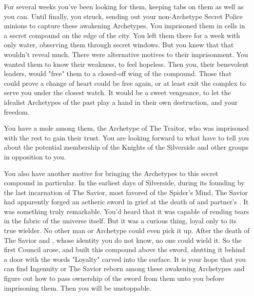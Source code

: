 \documentclass[blue]{Silversiders}
\begin{document}
For several weeks you've been looking for them, keeping tabs on them as well as you can. Until finally, you struck, sending out your non-Archetype Secret Police minions to capture these awakening Archetypes. You imprisoned them in cells in a secret compound on the edge of the city. You left them there for a week with only water, observing them through secret windows. But you knew that that wouldn't reveal much. There were alternative motives to their imprisonment. You wanted them to know their weakness, to feel hopeless. Then you, their benevolent leaders, would "free" them to a closed-off wing of the compound. Those that could prove a change of heart could be free again, or at least exit the complex to serve you under the closest watch. It would be a sweet vengeance, to let the idealist Archetypes of the past play a hand in their own destruction, and your freedom.

You have a mole among them, the Archetype of The Traitor, who was imprisoned with the rest to gain their trust. You are looking forward to what \cTraitor{\they} have to tell you about the potential membership of the Knights of the Silverside and other groups in opposition to you.

You also have another motive for bringing the Archetypes to this secret compound in particular. In the earliest days of Silverside, during its founding by the last incarnation of The Savior, most favored of the Spider's Mind, The Savior had apparently forged an aetheric sword in \cSavior{\their} grief at the death of \cSavior{\their} and \cSavior{\their} partner's \cLoyalty{\offspring}. It was something truly remarkable. You'd heard that it was capable of rending tears in the fabric of the universe itself. But it was a curious thing, loyal only to its true wielder. No other man or Archetype could even pick it up. After the death of The Savior and \cSavior{\their} \cIngenuityOld{\spouse}, whose identity you do not know, no one could wield it. So the first Council arose, and built this compound above the sword, shutting it behind a door with the words "Loyalty" carved into the surface. It is your hope that you can find Ingenuity or The Savior reborn among these awakening Archetypes and figure out how to pass ownership of the sword from them unto you before imprisoning them. Then you will be unstoppable.
\end{document}
